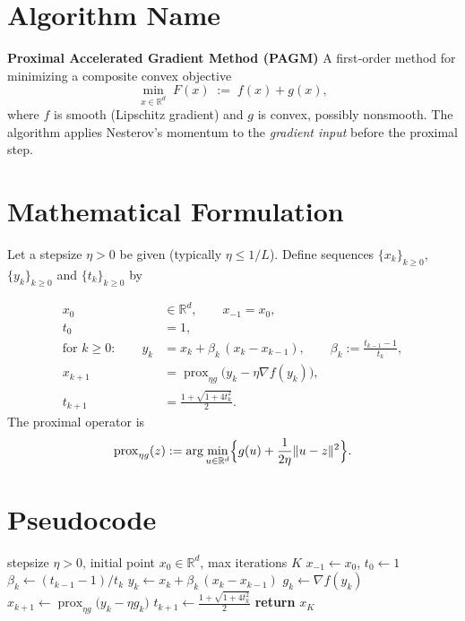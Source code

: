 \documentclass{article}
\newcommand{\prox}{\operatorname{prox}}
\newcommand{\R}{\mathbb{R}}
\begin{document}
\section*{Algorithm Name}
\textbf{Proximal Accelerated Gradient Method (PAGM)}  
A first‑order method for minimizing a composite convex objective  
\[
\min_{x\in\R^{d}} \; F(x)\;:=\; f(x)+g(x),
\]
where $f$ is smooth (Lipschitz gradient) and $g$ is convex, possibly nonsmooth.  
The algorithm applies Nesterov’s momentum to the \emph{gradient input} before the proximal step.

\section*{Mathematical Formulation}
Let a stepsize $\eta>0$ be given (typically $\eta\le 1/L$).  
Define sequences $\{x_k\}_{k\ge 0}$, $\{y_k\}_{k\ge 0}$ and $\{t_k\}_{k\ge 0}$ by  

\[
\begin{aligned}
x_0 &\in\R^{d},\qquad x_{-1}=x_0,\\[4pt]
t_0 &=1, \\[4pt]
\text{for }k\ge 0:\qquad 
y_k &= x_k+\beta_k\,(x_k-x_{k-1}),\qquad 
\beta_k:=\frac{t_{k-1}-1}{t_k},\\[4pt]
x_{k+1} &= \prox_{\eta g}\!\bigl(y_k-\eta\nabla f(y_k)\bigr),\\[4pt]
t_{k+1} &= \frac{1+\sqrt{1+4t_k^{2}}}{2}.
\end{aligned}
\]
The proximal operator is
\[
\prox_{\eta g}(z):=\arg\min_{u\in\R^{d}}\Bigl\{g(u)+\frac{1}{2\eta}\|u-z\|^{2}\Bigr\}.
\]

\section*{Pseudocode}
\begin{algorithm}[H]
\caption{Proximal Accelerated Gradient Method}
\begin{algorithmic}[1]
\Require stepsize $\eta>0$, initial point $x_0\in\R^{d}$, max iterations $K$
\State $x_{-1}\gets x_0$, $t_0\gets 1$
    \State $\beta_k\gets (t_{k-1}-1)/t_k$
    \State $y_k\gets x_k+\beta_k\,(x_k-x_{k-1})$
    \State $g_k\gets \nabla f(y_k)$
    \State $x_{k+1}\gets \prox_{\eta g}\!\bigl(y_k-\eta g_k\bigr)$
    \State $t_{k+1}\gets \frac{1+\sqrt{1+4t_k^{2}}}{2}$
\EndFor
\State \textbf{return} $x_{K}$
\end{algorithmic}
\end{algorithm}
\end{document}
